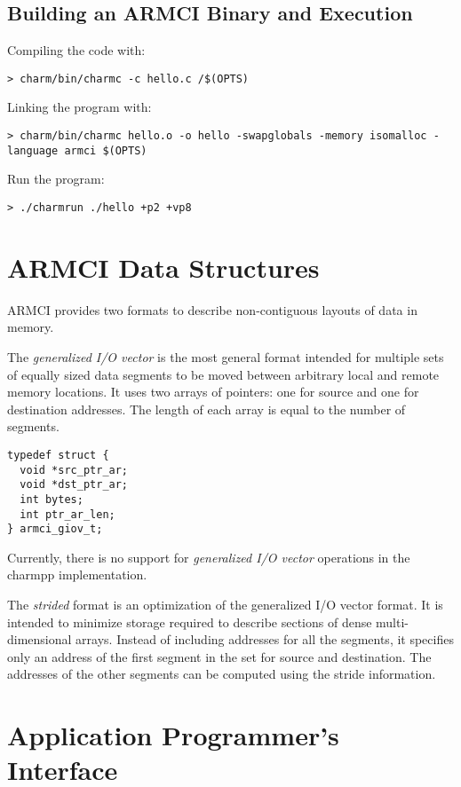 \documentclass[10pt]{article}
\begin{document}
\subsection{Building an ARMCI Binary and Execution}
\label{sec::armci build}

Compiling the code with:
\begin{verbatim}
> charm/bin/charmc -c hello.c /$(OPTS)
\end{verbatim}

\noindent
Linking the program with:
\begin{verbatim}
> charm/bin/charmc hello.o -o hello -swapglobals -memory isomalloc -language armci $(OPTS)
\end{verbatim}

\noindent
Run the program:
\begin{verbatim}
> ./charmrun ./hello +p2 +vp8
\end{verbatim}

\section{ARMCI Data Structures}
\label{sec::data structures}

ARMCI provides two formats to describe non-contiguous layouts of data
in memory.

The {\em generalized I/O vector} is the most general format intended
for multiple sets of equally sized data segments to be moved between
arbitrary local and remote memory locations. It uses two arrays of
pointers: one for source and one for destination addresses. The length
of each array is equal to the number of segments.

\begin{verbatim}
typedef struct {
  void *src_ptr_ar;
  void *dst_ptr_ar;
  int bytes;
  int ptr_ar_len;
} armci_giov_t;
\end{verbatim}

Currently, there is no support for {\em generalized I/O vector}
operations in the charmpp{} implementation.

The {\em strided} format is an optimization of the generalized I/O
vector format. It is intended to minimize storage required to describe
sections of dense multi-dimensional arrays. Instead of including
addresses for all the segments, it specifies only an address of the
first segment in the set for source and destination. The addresses of
the other segments can be computed using the stride information.

\section{Application Programmer's Interface}
\label{sec::api}
\end{document}
